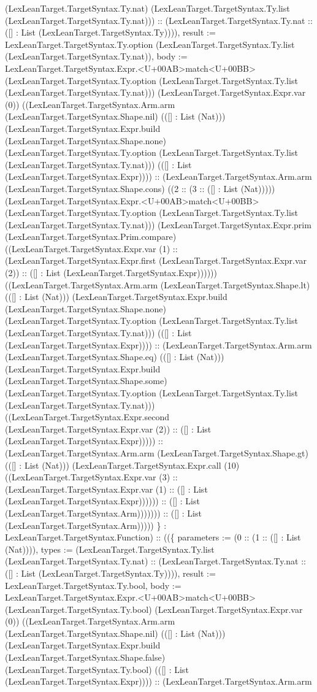 \documentclass[11pt]{article}
\begin{document}
(LexLeanTarget.TargetSyntax.Ty.nat) (LexLeanTarget.TargetSyntax.Ty.list (LexLeanTarget.TargetSyntax.Ty.nat))) :: (LexLeanTarget.TargetSyntax.Ty.nat :: ([] : List (LexLeanTarget.TargetSyntax.Ty)))), result := LexLeanTarget.TargetSyntax.Ty.option (LexLeanTarget.TargetSyntax.Ty.list (LexLeanTarget.TargetSyntax.Ty.nat)), body := LexLeanTarget.TargetSyntax.Expr.<U+00AB>match<U+00BB> (LexLeanTarget.TargetSyntax.Ty.option (LexLeanTarget.TargetSyntax.Ty.list (LexLeanTarget.TargetSyntax.Ty.nat))) (LexLeanTarget.TargetSyntax.Expr.var (0)) ((LexLeanTarget.TargetSyntax.Arm.arm (LexLeanTarget.TargetSyntax.Shape.nil) (([] : List (Nat))) (LexLeanTarget.TargetSyntax.Expr.build (LexLeanTarget.TargetSyntax.Shape.none) (LexLeanTarget.TargetSyntax.Ty.option (LexLeanTarget.TargetSyntax.Ty.list (LexLeanTarget.TargetSyntax.Ty.nat))) (([] : List (LexLeanTarget.TargetSyntax.Expr)))) :: (LexLeanTarget.TargetSyntax.Arm.arm (LexLeanTarget.TargetSyntax.Shape.cons) ((2 :: (3 :: ([] : List (Nat))))) (LexLeanTarget.TargetSyntax.Expr.<U+00AB>match<U+00BB> (LexLeanTarget.TargetSyntax.Ty.option (LexLeanTarget.TargetSyntax.Ty.list (LexLeanTarget.TargetSyntax.Ty.nat))) (LexLeanTarget.TargetSyntax.Expr.prim (LexLeanTarget.TargetSyntax.Prim.compare) ((LexLeanTarget.TargetSyntax.Expr.var (1) :: (LexLeanTarget.TargetSyntax.Expr.first (LexLeanTarget.TargetSyntax.Expr.var (2)) :: ([] : List (LexLeanTarget.TargetSyntax.Expr)))))) ((LexLeanTarget.TargetSyntax.Arm.arm (LexLeanTarget.TargetSyntax.Shape.lt) (([] : List (Nat))) (LexLeanTarget.TargetSyntax.Expr.build (LexLeanTarget.TargetSyntax.Shape.none) (LexLeanTarget.TargetSyntax.Ty.option (LexLeanTarget.TargetSyntax.Ty.list (LexLeanTarget.TargetSyntax.Ty.nat))) (([] : List (LexLeanTarget.TargetSyntax.Expr)))) :: (LexLeanTarget.TargetSyntax.Arm.arm (LexLeanTarget.TargetSyntax.Shape.eq) (([] : List (Nat))) (LexLeanTarget.TargetSyntax.Expr.build (LexLeanTarget.TargetSyntax.Shape.some) (LexLeanTarget.TargetSyntax.Ty.option (LexLeanTarget.TargetSyntax.Ty.list (LexLeanTarget.TargetSyntax.Ty.nat))) ((LexLeanTarget.TargetSyntax.Expr.second (LexLeanTarget.TargetSyntax.Expr.var (2)) :: ([] : List (LexLeanTarget.TargetSyntax.Expr))))) :: (LexLeanTarget.TargetSyntax.Arm.arm (LexLeanTarget.TargetSyntax.Shape.gt) (([] : List (Nat))) (LexLeanTarget.TargetSyntax.Expr.call (10) ((LexLeanTarget.TargetSyntax.Expr.var (3) :: (LexLeanTarget.TargetSyntax.Expr.var (1) :: ([] : List (LexLeanTarget.TargetSyntax.Expr)))))) :: ([] : List (LexLeanTarget.TargetSyntax.Arm))))))) :: ([] : List (LexLeanTarget.TargetSyntax.Arm))))) \} : LexLeanTarget.TargetSyntax.Function) :: ((\{ parameters := (0 :: (1 :: ([] : List (Nat)))), types := (LexLeanTarget.TargetSyntax.Ty.list (LexLeanTarget.TargetSyntax.Ty.nat) :: (LexLeanTarget.TargetSyntax.Ty.nat :: ([] : List (LexLeanTarget.TargetSyntax.Ty)))), result := LexLeanTarget.TargetSyntax.Ty.bool, body := LexLeanTarget.TargetSyntax.Expr.<U+00AB>match<U+00BB> (LexLeanTarget.TargetSyntax.Ty.bool) (LexLeanTarget.TargetSyntax.Expr.var (0)) ((LexLeanTarget.TargetSyntax.Arm.arm (LexLeanTarget.TargetSyntax.Shape.nil) (([] : List (Nat))) (LexLeanTarget.TargetSyntax.Expr.build (LexLeanTarget.TargetSyntax.Shape.false) (LexLeanTarget.TargetSyntax.Ty.bool) (([] : List (LexLeanTarget.TargetSyntax.Expr)))) :: (LexLeanTarget.TargetSyntax.Arm.arm 
\end{document}
